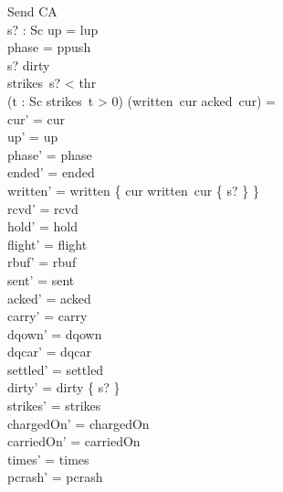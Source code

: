 \documentclass[a4paper,10pt,fleqn]{article}
\begin{document}
\begin{schema}{Send}
  \Delta CA \\
  s? : Sc
\where
  up = lup \\
  phase = ppush \\
  s? \in dirty \\
  strikes~s? < thr \\
  (\exists t : Sc \spot strikes~t > 0) \implies (written~cur \setminus acked~cur) = \emptyset \\
  cur' = cur \\
  up' = up \\
  phase' = phase \\
  ended' = ended \\
  written' = written \oplus \{ cur \mapsto written~cur \cup \{ s? \} \} \\
  rcvd' = rcvd \\
  hold' = hold \\
  flight' = flight \\
  rbuf' = rbuf \\
  sent' = sent \\
  acked' = acked \\
  carry' = carry \\
  dqown' = dqown \\
  dqcar' = dqcar \\
  settled' = settled \\
  dirty' = dirty \setminus \{ s? \} \\
  strikes' = strikes \\
  chargedOn' = chargedOn \\
  carriedOn' = carriedOn \\
  times' = times \\
  pcrash' = pcrash
\end{schema}
\end{document}
